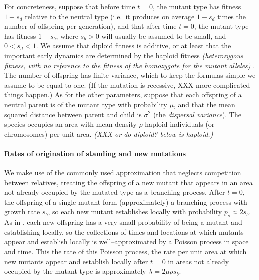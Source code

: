\documentclass{article}
\newcommand{\gc}[1]{{\it\color{green}(#1)} }
\newcommand{\marginnote}[1]{{\it\color{red}(#1)}}
\begin{document}
For concreteness, suppose that before time $t=0$,
the mutant type has fitness $1-s_d$ relative to the neutral type
(i.e.\ it produces on average $1-s_d$ times the number of offspring per generation),
and that after time $t=0$,
the mutant type has fitness $1+s_b$,
where $s_b>0$ will usually be assumed to be small, and $0<s_d<1$.
We assume that diploid fitness is additive, or at least that the
important early dynamics are determined by the haploid fitness
\gc{heterozygous fitness, with no reference to the fitness of the
  homozygote for the mutant alleles}.
The number of offspring has finite variance, which to keep the formulas simple we assume to be equal to one.
(If the mutation is recessive, XXX more complicated things happen.)
As for the other parameters,
suppose that each offspring of a neutral parent is of the mutant type with probability $\mu$,
and that the mean squared distance between parent and child is $\sigma^2$ (the {\em dispersal variance}).
The species occupies an area with mean density
$\rho$ haploid individuals (or chromosomes) per unit area.
\marginnote{XXX or do diploid? below is haploid.}



\paragraph{Rates of origination of standing and new mutations}
We make use of the commonly used approximation that neglects competition between relatives,
treating the offspring of a new mutant that appears in an area not already occupied by the mutated type
as a branching process.
After $t=0$, the offspring of a single mutant form (approximately) a branching process with growth rate $s_b$,
so each new mutant establishes locally with probability $p_s \approx 2s_b$.
As in \cite{ralphcoop2010}, each new offspring has a very small probability of being a mutant and establishing locally,
so the collections of times and locations at which mutants appear and establish locally 
is well--approximated by a Poisson process in space and time.
This the rate of this Poisson process, 
the rate per unit area at which new mutants appear and establish locally after $t=0$ in areas not already occupied by the mutant type
is approximately $\lambda = 2 \mu \rho s_b$.
\end{document}
